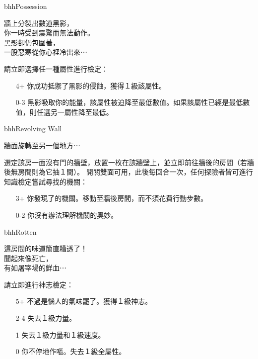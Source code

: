 \linebreak[0]%
\begin{EventCard}{bhh}{Possession}
  \begin{CardStory}
    牆上分裂出數道黑影，\\
    你一時受到震驚而無法動作。\\
    黑影卻仍包圍著，\\
    一股惡寒從你心裡冷出來⋯
  \end{CardStory}
  請立即選擇任一種屬性進行檢定：
  \begin{itemize}
    \item[4+] 你成功抵禦了黑影的侵蝕，獲得１級該屬性。
    \item[0-3] 黑影吸取你的能量，該屬性被迫降至最低數值。如果該屬性已經是最低數值，則任選另一屬性降至最低。
  \end{itemize}
\end{EventCard}%
\linebreak[0]%
\begin{EventCard}{bhh}{Revolving Wall}
  \begin{CardStory}
    牆面旋轉至另一個地方⋯
  \end{CardStory}
  選定該房一面沒有門的牆壁，放置一枚在該牆壁上，並立即前往牆後的房間（若牆後無房間則為它抽１間）。\smallbreak
  開關雙面可用，此後每回合一次，任何探險者皆可進行知識檢定嘗試尋找\ThisName{}的機關：
  \begin{itemize}
    \item[3+] 你發現了\ThisName{}的機關。移動至牆後房間，而不須花費行動步數。
    \item[0-2] 你沒有辦法理解機關的奧妙。
  \end{itemize}
\end{EventCard}%
\linebreak[0]%
\begin{EventCard}{bhh}{Rotten}
  \begin{CardStory}
    這房間的味道簡直糟透了！\\
    聞起來像死亡，\\
    有如屠宰場的鮮血⋯
  \end{CardStory}
  請立即進行神志檢定：
  \begin{itemize}
    \item[5+] 不過是惱人的氣味罷了。獲得１級神志。
    \item[2-4] 失去１級力量。
    \item[1] 失去１級力量和１級速度。
    \item[0] 你不停地作嘔。失去１級全屬性。
  \end{itemize}
\end{EventCard}%
